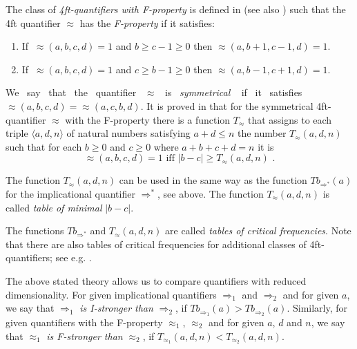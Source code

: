 The class of {\em 4ft-quantifiers with F-property} is defined in \cite{Ra:86} (see  also 
\cite{Ra:07}) such that 
the 4ft quantifier $\approx$ has the {\em F-property} if it satisfies:
\begin{enumerate}
\item If $ \  \approx(a,b,c,d) = 1 $ and $ b \geq c-1 \geq 0 $
then $ \approx(a,b+1,c-1,d) = 1 $.

\item If $ \ \approx(a,b,c,d) = 1 $ and $ c \geq b -1 \geq 0 $
then $ \approx(a,b-1,c+1,d) = 1 $.
\end{enumerate}

We \ say \ that \ the \ quantifier \ $\approx$ \ is \ {\em symmetrical} \ \cite{Ha:78}
if \ it \ satisfies \mbox{$\approx(a,b,c,d) = \approx(a,c,b,d)$}. 
It is proved in \cite{Ra:86} that for the symmetrical 4ft-quantifier $\approx$ with the 
F-property there is a function $T_{\approx}$ that assigns to each triple $\langle a,d,n \rangle$ of natural numbers satisfying 
$a+d \leq n $ the number $T_{\approx}(a,d,n)$ such that for each $b \geq 0$ and $c \geq 0$ where 
$a+b+c+d = n $ it is 
%
$$ \approx(a,b,c,d) = 1 \mbox{ iff } |b-c| \geq T_{\approx}(a,d,n) \mbox{ .}$$

The function $T_{\approx}(a,d,n)$ can be used in the same way as the function 
$ Tb_{\Rightarrow^{*}}(a) $ for the implicational quantifier 
$ \Rightarrow^{*}$,  see above. 
The function $T_{\approx}(a,d,n)$ is called {\em table of minimal} 
$|b-c|$. 

The  functions $Tb_{\Rightarrow^{*}}$ and $T_{\approx}(a,d,n)$ are called 
{\em tables of critical frequencies}. Note that there are also tables of critical frequencies 
for additional classes  of 4ft-quantifiers; see e.g. \cite{Ra:07}. 

The above stated theory allows us to compare quantifiers with reduced dimensionality. For given implicational quantifiers $\Rightarrow_{1}$ and $\Rightarrow_{2}$ and for given $a$, we say that $\Rightarrow_{1}$ \emph{is I-stronger than} $\Rightarrow_{2}$, if $Tb_{\Rightarrow_{1}}(a) > Tb_{\Rightarrow_{2}}(a)$. Similarly, for given quantifiers with the F-property $\approx_{1}$, $\approx_{2}$ and for given $a$, $d$ and $n$, we say that $\approx_{1}$ \emph{is F-stronger than} $\approx_{2}$, if $T_{\approx_{1}}(a,d,n) < T_{\approx_{2}}(a,d,n)$.